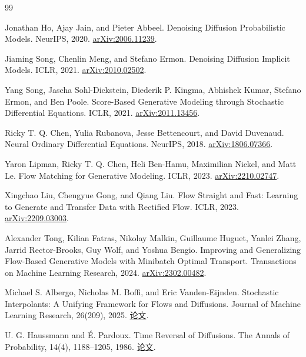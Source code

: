 \begin{thebibliography}{99}
\raggedright

Jonathan Ho, Ajay Jain, and Pieter Abbeel.
\newblock Denoising Diffusion Probabilistic Models.
\newblock NeurIPS, 2020.
\href{https://arxiv.org/abs/2006.11239}{arXiv:2006.11239}.

Jiaming Song, Chenlin Meng, and Stefano Ermon.
\newblock Denoising Diffusion Implicit Models.
\newblock ICLR, 2021.
\href{https://arxiv.org/abs/2010.02502}{arXiv:2010.02502}.

Yang Song, Jascha Sohl-Dickstein, Diederik P. Kingma, Abhishek Kumar,
Stefano Ermon, and Ben Poole.
\newblock Score-Based Generative Modeling through Stochastic Differential Equations.
\newblock ICLR, 2021.
\href{https://arxiv.org/abs/2011.13456}{arXiv:2011.13456}.

Ricky T. Q. Chen, Yulia Rubanova, Jesse Bettencourt, and David Duvenaud.
\newblock Neural Ordinary Differential Equations.
\newblock NeurIPS, 2018.
\href{https://arxiv.org/abs/1806.07366v1}{arXiv:1806.07366}.

Yaron Lipman, Ricky T. Q. Chen, Heli Ben-Hamu, Maximilian Nickel,
and Matt Le.
\newblock Flow Matching for Generative Modeling.
\newblock ICLR, 2023.
\href{https://arxiv.org/abs/2210.02747}{arXiv:2210.02747}.

Xingchao Liu, Chengyue Gong, and Qiang Liu.
\newblock Flow Straight and Fast: Learning to Generate and Transfer
Data with Rectified Flow.
\newblock ICLR, 2023.
\href{https://arxiv.org/abs/2209.03003}{arXiv:2209.03003}.

Alexander Tong, Kilian Fatras, Nikolay Malkin, Guillaume Huguet,
Yanlei Zhang, Jarrid Rector-Brooks, Guy Wolf, and Yoshua Bengio.
\newblock Improving and Generalizing Flow-Based Generative Models
with Minibatch Optimal Transport.
\newblock Transactions on Machine Learning Research, 2024.
\href{https://arxiv.org/abs/2302.00482}{arXiv:2302.00482}.

Michael S. Albergo, Nicholas M. Boffi, and Eric Vanden-Eijnden.
\newblock Stochastic Interpolants: A Unifying Framework for Flows and Diffusions.
\newblock Journal of Machine Learning Research, 26(209), 2025.
\href{https://jmlr.org/papers/v26/23-1605.html}{论文}.

U. G. Haussmann and É. Pardoux.
\newblock Time Reversal of Diffusions.
\newblock The Annals of Probability, 14(4), 1188--1205, 1986.
\href{https://www.i2m.univ-amu.fr/perso/etienne.pardoux/_media/trd.pdf}{论文}.


\end{thebibliography}
